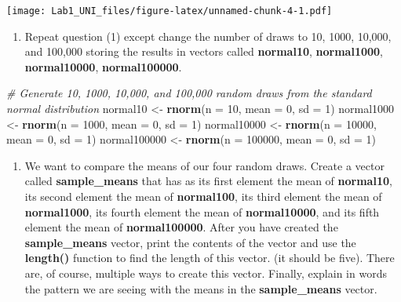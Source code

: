 \documentclass[]{article}
\newenvironment{Shaded}{\begin{snugshade}}{\end{snugshade}}
\newcommand{\KeywordTok}[1]{\textcolor[rgb]{0.13,0.29,0.53}{\textbf{#1}}}
\newcommand{\DataTypeTok}[1]{\textcolor[rgb]{0.13,0.29,0.53}{#1}}
\newcommand{\DecValTok}[1]{\textcolor[rgb]{0.00,0.00,0.81}{#1}}
\newcommand{\StringTok}[1]{\textcolor[rgb]{0.31,0.60,0.02}{#1}}
\newcommand{\CommentTok}[1]{\textcolor[rgb]{0.56,0.35,0.01}{\textit{#1}}}
\newcommand{\NormalTok}[1]{#1}
\providecommand{\tightlist}{%
  \setlength{\itemsep}{0pt}\setlength{\parskip}{0pt}}
\begin{document}
\texttt{[image: Lab1\_UNI\_files/figure-latex/unnamed-chunk-4-1.pdf]}

\begin{enumerate}
\def\labelenumi{\arabic{enumi})}
\setcounter{enumi}{2}
\tightlist
\item
  Repeat question (1) except change the number of draws to 10, 1000,
  10,000, and 100,000 storing the results in vectors called
  \textbf{normal10}, \textbf{normal1000}, \textbf{normal10000},
  \textbf{normal100000}.
\end{enumerate}

\begin{Shaded}
\begin{Highlighting}[]
\CommentTok{# Generate 10, 1000, 10,000, and 100,000 random draws from the standard normal distribution}
\NormalTok{normal10 <-}\StringTok{ }\KeywordTok{rnorm}\NormalTok{(}\DataTypeTok{n =} \DecValTok{10}\NormalTok{, }\DataTypeTok{mean =} \DecValTok{0}\NormalTok{, }\DataTypeTok{sd =} \DecValTok{1}\NormalTok{)}
\NormalTok{normal1000 <-}\StringTok{ }\KeywordTok{rnorm}\NormalTok{(}\DataTypeTok{n =} \DecValTok{1000}\NormalTok{, }\DataTypeTok{mean =} \DecValTok{0}\NormalTok{, }\DataTypeTok{sd =} \DecValTok{1}\NormalTok{)}
\NormalTok{normal10000 <-}\StringTok{ }\KeywordTok{rnorm}\NormalTok{(}\DataTypeTok{n =} \DecValTok{10000}\NormalTok{, }\DataTypeTok{mean =} \DecValTok{0}\NormalTok{, }\DataTypeTok{sd =} \DecValTok{1}\NormalTok{)}
\NormalTok{normal100000 <-}\StringTok{ }\KeywordTok{rnorm}\NormalTok{(}\DataTypeTok{n =} \DecValTok{100000}\NormalTok{, }\DataTypeTok{mean =} \DecValTok{0}\NormalTok{, }\DataTypeTok{sd =} \DecValTok{1}\NormalTok{)}
\end{Highlighting}
\end{Shaded}

\begin{enumerate}
\def\labelenumi{\arabic{enumi})}
\setcounter{enumi}{3}
\tightlist
\item
  We want to compare the means of our four random draws. Create a vector
  called \textbf{sample\_means} that has as its first element the mean
  of \textbf{normal10}, its second element the mean of
  \textbf{normal100}, its third element the mean of \textbf{normal1000},
  its fourth element the mean of \textbf{normal10000}, and its fifth
  element the mean of \textbf{normal100000}. After you have created the
  \textbf{sample\_means} vector, print the contents of the vector and
  use the \textbf{length()} function to find the length of this vector.
  (it should be five). There are, of course, multiple ways to create
  this vector. Finally, explain in words the pattern we are seeing with
  the means in the \textbf{sample\_means} vector.
\end{enumerate}
\end{document}

